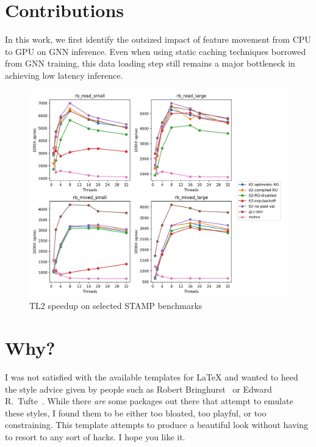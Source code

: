 \section{Contributions}
In this work, we first identify the outsized impact of feature movement from CPU to GPU on GNN inference. 
Even when using static caching techniques borrowed from GNN training, this data loading step still remains a major bottleneck in achieving low latency inference. 



\begin{figure}[]
\centering
\includegraphics[width=\textwidth]{Sources/rb_graph (1).png}

\caption{TL2 speedup on selected STAMP benchmarks}
\label{GNN Execution Diagram}
\end{figure} 


\section{Why?}

I was not satisfied with the available templates for \LaTeX{} and wanted
to heed the style advice given by people such as Robert
Bringhurst~\cite{Bringhurst12} or Edward R.\
Tufte~\cite{Tufte90,Tufte01}. While there \emph{are} some packages out
there that attempt to emulate these styles, I found them to be either
too bloated, too playful, or too constraining. This template attempts to
produce a beautiful look without having to resort to any sort of hacks.
I hope you like it.

